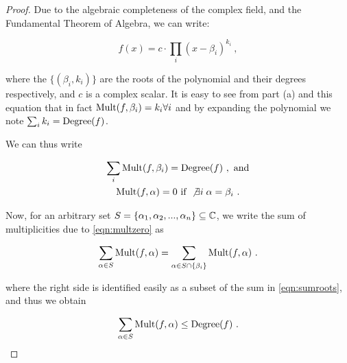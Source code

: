 \begin{alphaparts}
    \questionpart 
    \begin{proof}
        Due to the algebraic completeness of the complex field, and
        the Fundamental Theorem of Algebra, we can write:
    
        \begin{equation}
            f(x) = c\cdot\prod_i (x-\beta_i)^{k_i}~,
        \end{equation}
    
        where the \(\{(\beta_i, k_i)\}\) are the roots of the polynomial and
        their degrees respectively, and \(c\) is a complex scalar. It is easy to
        see from part (a) and this equation that in fact \(\textnormal{Mult}(f, \beta_i) =
        k_i \forall i\) and by expanding the polynomial we note \(\sum_{i} k_i =
        \textnormal{Degree}(f)\).
    
        We can thus write
    
        \begin{gather}
            \sum_{i} \textnormal{Mult}(f, \beta_i) = \textnormal{Degree}(f)~, \textnormal{ and} \label{eqn:sumroots}\\
            \textnormal{Mult}(f, \alpha) = 0 \textnormal{ if } \not \exists i\;\alpha = \beta_i~.
            \label{eqn:multzero}
        \end{gather}
    
        Now, for an arbitrary set \(S = \{\alpha_1, \alpha_2, ..., \alpha_n\}
        \subseteq \mathbb{C}\), we write the sum of multiplicities due to
        \autoref{eqn:multzero} as
    
        \begin{equation}
            \sum_{\alpha \in S} \textnormal{Mult}(f, \alpha) = \sum_{\alpha \in S \cap \{\beta_i\}} \textnormal{Mult}(f, \alpha)~.
        \end{equation}
    
        where the right side is identified easily as a subset of the sum in
        \autoref{eqn:sumroots}, and thus we obtain
    
        \begin{equation}
            \sum_{\alpha \in S} \textnormal{Mult}(f, \alpha) \leq \textnormal{Degree}(f)~.
        \end{equation}
    \end{proof}

\end{alphaparts}